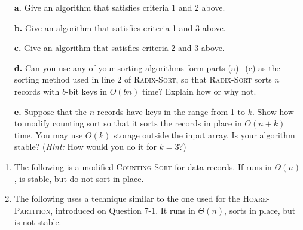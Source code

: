 \documentclass{report}
\makeatletter
\renewenvironment{framed}{%
 \def\FrameCommand##1{\hskip\@totalleftmargin
 \fboxsep=\FrameSep\fbox{##1}}%
 \MakeFramed {\advance\hsize-\width
   \@totalleftmargin\z@ \linewidth\hsize
   \@setminipage}}%
 {\par\unskip\endMakeFramed}
\let\oldnl\nl%
\newcommand{\nonl}{\renewcommand{\nl}{\let\nl\oldnl}}%
\makeatother
\begin{document}
\begin{enumerate}
{\begin{enumerate}
  \item[\textbf{a.}] Give an algorithm that satisfies criteria 1 and 2 above.
  \item[\textbf{b.}] Give an algorithm that satisfies criteria 1 and 3 above.
  \item[\textbf{c.}] Give an algorithm that satisfies criteria 2 and 3 above.
  \item[\textbf{d.}] Can you use any of your sorting algorithms form parts
    (a)${-}$(c) as the sorting method used in line 2 of \textsc{Radix-Sort}, so
    that \textsc{Radix-Sort} sorts $n$ records with $b$-bit keys in $O(bn)$
    time? Explain how or why not.
  \item[\textbf{e.}] Suppose that the $n$ records have keys in the range from
    1 to $k$. Show how to modify counting sort so that it sorts the records in
    place in $O(n + k)$ time. You may use $O(k)$ storage outside the input
    array. Is your algorithm stable? (\emph{Hint:} How would you do it for $k
    = 3$?)
\end{enumerate}
}

\begin{framed}
\begin{enumerate}
\item{The following is a modified \textsc{Counting-Sort} for data records. If
runs in $\Theta(n)$, is stable, but do not sort in place.

\begin{algorithm}[H]
\SetAlgoNoEnd\DontPrintSemicolon
\BlankLine
{}
\nonl{}
\end{algorithm}
}

\item{The following uses a technique similar to the one used for the
\textsc{Hoare-Partition}, introduced on Question 7-1. It runs in $\Theta(n)$,
sorts in place, but is not stable.

}
\end{enumerate}
\end{framed}
\end{enumerate}
\end{document}
